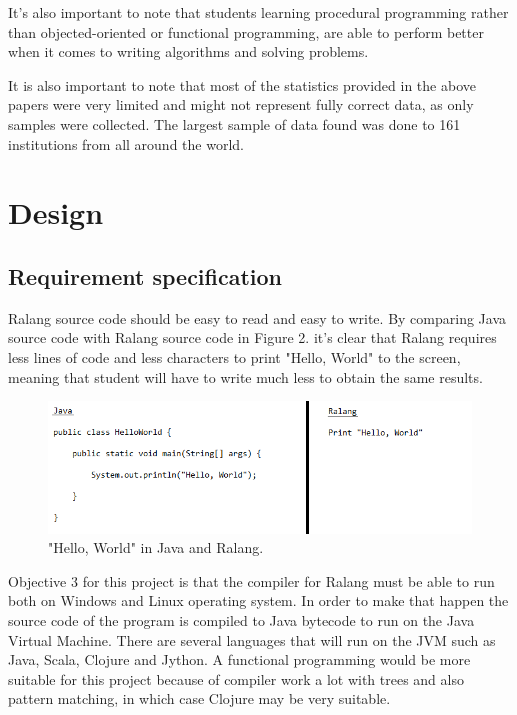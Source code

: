 \documentclass[a4paper]{article}
\begin{document}
It's also important to note that students learning procedural programming rather than objected-oriented or functional programming, are able to perform better when it comes to writing algorithms and solving problems. \parencite{Kolling1999}

It is also important to note that most of the statistics provided in the above papers were very limited and might not represent fully correct data, as only samples were collected. The largest sample of data found was done to 161 institutions from all around the world.

\newpage
\section{Design}

\subsection{Requirement specification}

Ralang source code should be easy to read and easy to write. By comparing Java source code with Ralang source code in Figure 2. it's clear that Ralang requires less lines of code and less characters to print "Hello, World" to the screen, meaning that student will have to write much less to obtain the same results.\\
\begin{figure}[H]
	\vspace{-10pt}
	\begin{center}
		\includegraphics[width=\textwidth]{sampleRalang}
	\end{center}
	\caption{"Hello, World" in Java and Ralang.}
	\vspace{10pt}
\end{figure}
Objective 3 for this project is that the compiler for Ralang must be able to run both on Windows and Linux operating system. In order to make that happen the source code of the program is compiled to Java bytecode to run on the Java Virtual Machine. There are several languages that will run on the JVM such as Java, Scala, Clojure and Jython. A functional programming would be more suitable for this project because of compiler work a lot with trees and also pattern matching, in which case Clojure may be very suitable.\\
\end{document}
